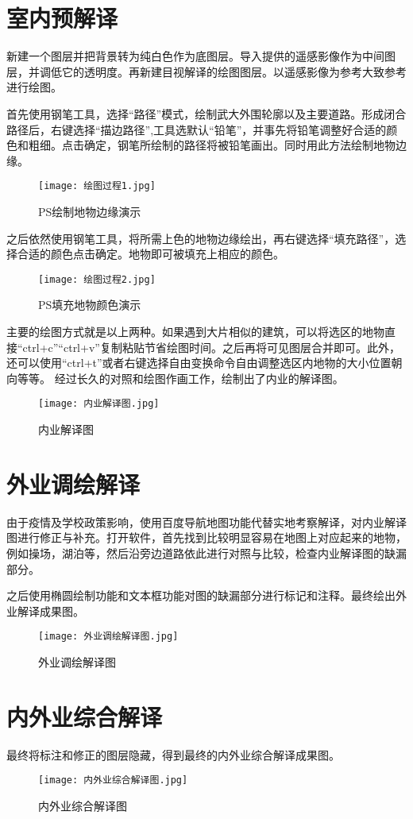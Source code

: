\documentclass{ctexart}
\begin{document}
\section{室内预解译}
新建一个图层并把背景转为纯白色作为底图层。导入提供的遥感影像作为中间图层，并调低它的透明度。再新建目视解译的绘图图层。以遥感影像为参考大致参考进行绘图。

首先使用钢笔工具，选择“路径”模式，绘制武大外围轮廓以及主要道路。形成闭合路径后，右键选择“描边路径”,工具选默认“铅笔”，并事先将铅笔调整好合适的颜色和粗细。点击确定，钢笔所绘制的路径将被铅笔画出。同时用此方法绘制地物边缘。

\begin{figure}[H]
\texttt{[image: 绘图过程1.jpg]}
\caption{PS绘制地物边缘演示}
\end{figure}

之后依然使用钢笔工具，将所需上色的地物边缘绘出，再右键选择“填充路径”，选择合适的颜色点击确定。地物即可被填充上相应的颜色。

\begin{figure}[H]
\texttt{[image: 绘图过程2.jpg]}
\caption{PS填充地物颜色演示}
\end{figure}

主要的绘图方式就是以上两种。如果遇到大片相似的建筑，可以将选区的地物直接“ctrl+c”“ctrl+v”复制粘贴节省绘图时间。之后再将可见图层合并即可。此外，还可以使用“ctrl+t”或者右键选择自由变换命令自由调整选区内地物的大小位置朝向等等。
\newpage
经过长久的对照和绘图作画工作，绘制出了内业的解译图。
\begin{figure}[H]
\texttt{[image: 内业解译图.jpg]}
\caption{内业解译图}
\end{figure}
\newpage
\section{外业调绘解译}
由于疫情及学校政策影响，使用百度导航地图功能代替实地考察解译，对内业解译图进行修正与补充。打开软件，首先找到比较明显容易在地图上对应起来的地物，例如操场，湖泊等，然后沿旁边道路依此进行对照与比较，检查内业解译图的缺漏部分。

之后使用椭圆绘制功能和文本框功能对图的缺漏部分进行标记和注释。最终绘出外业解译成果图。
\begin{figure}[H]
\texttt{[image: 外业调绘解译图.jpg]}
\caption{外业调绘解译图}
\end{figure}
\section{内外业综合解译}
最终将标注和修正的图层隐藏，得到最终的内外业综合解译成果图。
\begin{figure}[H]
\texttt{[image: 内外业综合解译图.jpg]}
\caption{内外业综合解译图}
\end{figure}
\end{document}

